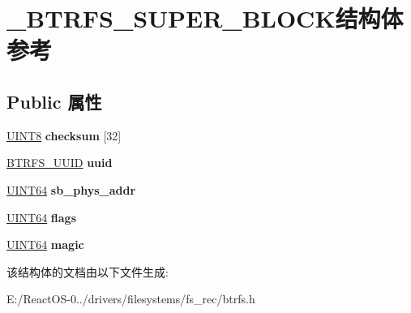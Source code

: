 \hypertarget{struct___b_t_r_f_s___s_u_p_e_r___b_l_o_c_k}{}\section{\+\_\+\+B\+T\+R\+F\+S\+\_\+\+S\+U\+P\+E\+R\+\_\+\+B\+L\+O\+C\+K结构体 参考}
\label{struct___b_t_r_f_s___s_u_p_e_r___b_l_o_c_k}
\subsection*{Public 属性}
\begin{DoxyCompactItemize}
\item 
\mbox{\label{struct___b_t_r_f_s___s_u_p_e_r___b_l_o_c_k_a49e4e369630b368b64fff31d0a825d96}} 
\hyperlink{_processor_bind_8h_ab27e9918b538ce9d8ca692479b375b6a}{U\+I\+N\+T8} {\bfseries checksum} \mbox{[}32\mbox{]}
\item 
\mbox{\label{struct___b_t_r_f_s___s_u_p_e_r___b_l_o_c_k_a81321e1d70f288d39cfc551c1a5292bd}} 
\hyperlink{struct_b_t_r_f_s___u_u_i_d}{B\+T\+R\+F\+S\+\_\+\+U\+U\+ID} {\bfseries uuid}
\item 
\mbox{\label{struct___b_t_r_f_s___s_u_p_e_r___b_l_o_c_k_a728ef280a73ce2f3b78b55687eae8930}} 
\hyperlink{_processor_bind_8h_a57be03562867144161c1bfee95ca8f7c}{U\+I\+N\+T64} {\bfseries sb\+\_\+phys\+\_\+addr}
\item 
\mbox{\label{struct___b_t_r_f_s___s_u_p_e_r___b_l_o_c_k_a7f06db3ec75337e09b4cbee177e610e6}} 
\hyperlink{_processor_bind_8h_a57be03562867144161c1bfee95ca8f7c}{U\+I\+N\+T64} {\bfseries flags}
\item 
\mbox{\label{struct___b_t_r_f_s___s_u_p_e_r___b_l_o_c_k_a40e81a758103cde994b9d0277a53188e}} 
\hyperlink{_processor_bind_8h_a57be03562867144161c1bfee95ca8f7c}{U\+I\+N\+T64} {\bfseries magic}
\end{DoxyCompactItemize}


该结构体的文档由以下文件生成\+:\begin{DoxyCompactItemize}
\item 
E\+:/\+React\+O\+S-\/0../drivers/filesystems/fs\+\_\+rec/btrfs.\+h\end{DoxyCompactItemize}
